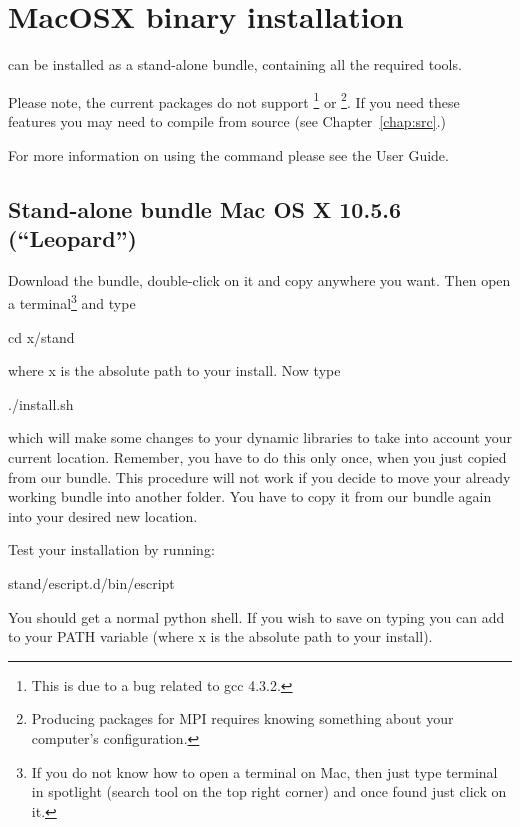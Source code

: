 
%
%
%

\section{MacOSX binary installation}
\label{sec:binmac}

\esfinley can be installed as a stand-alone bundle, containing all the required tools.

Please note, the current packages do not support \openmp\footnote{This is due to a bug related to gcc 4.3.2.} or \mpi\footnote{Producing packages for MPI requires knowing something about your computer's configuration.}.
If you need these features you may need to compile \esfinley from source (see Chapter~\ref{chap:src}.)

For more information on using the  command please see the User Guide.

\subsection{Stand-alone bundle Mac OS X 10.5.6 (``Leopard'')}

Download the bundle, double-click on it and copy   anywhere you want.
Then open a terminal\footnote{If you do not know how to open a terminal on Mac, then just type terminal in spotlight (search tool on the top right corner) and once found just click on it.} and type
\begin{shellCode}
cd x/stand 
\end{shellCode}
where x is the absolute path to your install. 
Now type
\begin{shellCode}
./install.sh 
\end{shellCode}
which will make some changes to your dynamic libraries to take into account your current location. Remember, you have  to do this only once, when you just copied from our bundle. This procedure will not work if you decide to move your already working bundle into another folder. You have to copy it from our bundle again into your desired new location.

Test your installation by running:
\begin{shellCode}
 stand/escript.d/bin/escript
\end{shellCode}
You should get a normal python shell.
If you wish to save on typing you can add  to your PATH variable (where x is the absolute path to your install). 

